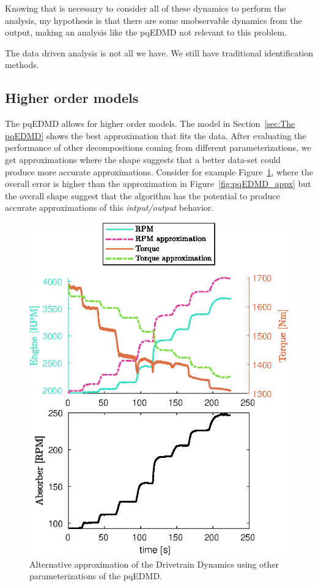 \documentclass{article}
\begin{document}
Knowing that is necessary to consider all of these dynamics to perform the analysis, my hypothesis is that there are some unobservable dynamics from the output, making an analysis like the pqEDMD not relevant to this problem.

The data driven analysis is not all we have. We still have traditional identification methods.
\subsection{Higher order models}\label{sub:Higher order models} %
The pqEDMD allows for higher order models. The model in Section~\ref{sec:The pqEDMD} shows the best approximation that fits the data. After evaluating the performance of other decompositions coming from different parameterizations, we get approximations where the shape suggests that a better data-set could produce more accurate approximations. Consider for example Figure~\ref{fig:another_EDMD_appx}, where the overall error is higher than the approximation in Figure~\ref{fig:pqEDMD_appx} but the overall shape suggest that the algorithm has the potential to produce accurate approximations of this \textit{intput/output} behavior.

\begin{figure}[ht]
\centering
\includegraphics[width=0.7\linewidth]{./figures/appx_alt_fig.eps}
\caption{Alternative approximation of the Drivetrain Dynamics using other parameterizations of the pqEDMD.}
\label{fig:another_EDMD_appx}
\end{figure}
\end{document}
